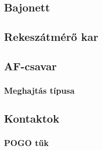 \subsection{Bajonett}
\subsection{Rekeszátmérő kar}
\subsection{AF-csavar}
\subsubsection{Meghajtás típusa} %
\subsection{Kontaktok}
\subsubsection{POGO tűk}
